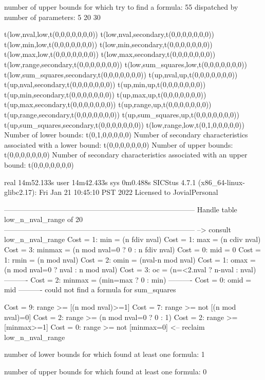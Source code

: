 number of upper bounds for which try to find a formula: 55
dispatched by number of parameters: 5  20  30

t(low,nval,low,t(0,0,0,0,0,0,0))
t(low,nval,secondary,t(0,0,0,0,0,0,0))
t(low,min,low,t(0,0,0,0,0,0,0))
t(low,min,secondary,t(0,0,0,0,0,0,0))
t(low,max,low,t(0,0,0,0,0,0,0))
t(low,max,secondary,t(0,0,0,0,0,0,0))
t(low,range,secondary,t(0,0,0,0,0,0,0))
t(low,sum_squares,low,t(0,0,0,0,0,0,0))
t(low,sum_squares,secondary,t(0,0,0,0,0,0,0))
t(up,nval,up,t(0,0,0,0,0,0,0))
t(up,nval,secondary,t(0,0,0,0,0,0,0))
t(up,min,up,t(0,0,0,0,0,0,0))
t(up,min,secondary,t(0,0,0,0,0,0,0))
t(up,max,up,t(0,0,0,0,0,0,0))
t(up,max,secondary,t(0,0,0,0,0,0,0))
t(up,range,up,t(0,0,0,0,0,0,0))
t(up,range,secondary,t(0,0,0,0,0,0,0))
t(up,sum_squares,up,t(0,0,0,0,0,0,0))
t(up,sum_squares,secondary,t(0,0,0,0,0,0,0))
t(low,range,low,t(0,1,0,0,0,0,0))
Number of lower bounds:                                             t(0,1,0,0,0,0,0)
Number of secondary characteristics associated with a lower bound:  t(0,0,0,0,0,0,0)
Number of upper bounds:                                             t(0,0,0,0,0,0,0)
Number of secondary characteristics associated with an upper bound: t(0,0,0,0,0,0,0)

real	14m52.133s
user	14m42.433s
sys	0m0.488s
SICStus 4.7.1 (x86_64-linux-glibc2.17): Fri Jan 21 10:45:10 PST 2022
Licensed to JovialPersonal


--------------------------------------------------------------------------------
Handle table low_n_nval_range of 20
--------------------------------------------------------------------------------
--> consult low_n_nval_range
Cost =  1:  min         = (n fdiv nval)
Cost =  1:  max         = (n cdiv nval)
Cost =  3:  minmax      = (n mod nval=0 ? 0 : n fdiv nval)
Cost =  0:  mid         = 0
Cost =  1:  rmin        = (n mod nval)
Cost =  2:  omin        = (nval-n mod nval)
Cost =  1:  omax        = (n mod nval=0 ? nval : n mod nval)
Cost =  3:  oc          = (n=<2.nval ? n-nval : nval)
----------
Cost =  2:  minmax      = (min=max ? 0 : min)
----------
Cost =  0:  omid        = mid
----------
could not find a formula for sum_squares

Cost =  9:  range >= [(n mod nval)>=1]
Cost =  7:  range >= not [(n mod nval)=0]
Cost =  2:  range >= (n mod nval=0 ? 0 : 1)
Cost =  2:  range >= [minmax>=1]
Cost =  0:  range >= not [minmax=0]
<-- reclaim low_n_nval_range

number of lower bounds for which found at least one formula: 1

number of upper bounds for which found at least one formula: 0

